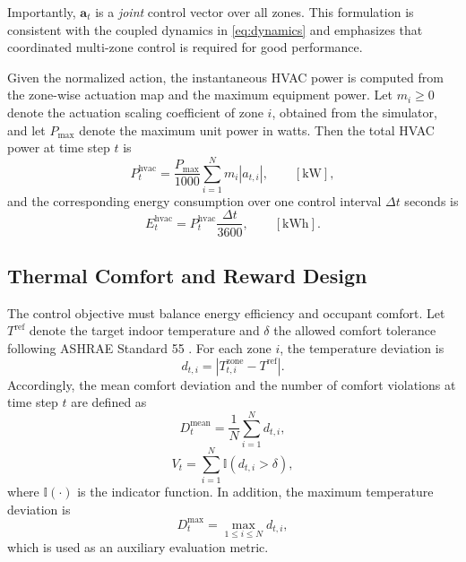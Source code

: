 \documentclass[lettersize,journal]{IEEEtran}
\theoremstyle{nonumberplain}     \theoremheaderfont{\bfseries\itshape}     \theorembodyfont{\normalfont}     \theoremseparator{:}     \theoremsymbol{\ensuremath{\blacksquare}}     \newtheorem{proof}{Proof}
\theoremstyle{plain}     \theoremheaderfont{\bfseries\itshape}     \theorembodyfont{\normalfont}     \theoremseparator{:}     \theoremsymbol{\ensuremath{\blacksquare}}     \newtheorem{remark}{Remark}
\begin{document}
Importantly, $\mathbf{a}_t$ is a \emph{joint} control vector over all zones. This formulation is consistent with the coupled dynamics in \eqref{eq:dynamics} and emphasizes that coordinated multi-zone control is required for good performance.

Given the normalized action, the instantaneous HVAC power is computed from the zone-wise actuation map and the maximum equipment power. Let $m_i \ge 0$ denote the actuation scaling coefficient of zone $i$, obtained from the simulator, and let $P_{\max}$ denote the maximum unit power in watts. Then the total HVAC power at time step $t$ is
\begin{equation}
    P_t^{\mathrm{hvac}}
    =
    \frac{P_{\max}}{1000}
    \sum_{i=1}^{N} m_i |a_{t,i}|,
    \qquad [\mathrm{kW}],
    \label{eq:power}
\end{equation}
and the corresponding energy consumption over one control interval $\Delta t$ seconds is
\begin{equation}
    E_t^{\mathrm{hvac}}
    =
    P_t^{\mathrm{hvac}} \frac{\Delta t}{3600},
    \qquad [\mathrm{kWh}].
    \label{eq:energy}
\end{equation}

\subsection{Thermal Comfort and Reward Design}
The control objective must balance energy efficiency and occupant comfort. Let $T^{\mathrm{ref}}$ denote the target indoor temperature and $\delta$ the allowed comfort tolerance following ASHRAE Standard 55 \cite{standard2023thermal}. For each zone $i$, the temperature deviation is
\begin{equation}
    d_{t,i} = \left| T_{t,i}^{\mathrm{zone}} - T^{\mathrm{ref}} \right|.
\end{equation}
Accordingly, the mean comfort deviation and the number of comfort violations at time step $t$ are defined as
\begin{equation}
    D_t^{\mathrm{mean}} = \frac{1}{N} \sum_{i=1}^{N} d_{t,i},
    \label{eq:comfort_mean}
\end{equation}
\begin{equation}
    V_t = \sum_{i=1}^{N} \mathbb{I}(d_{t,i} > \delta),
    \label{eq:violation}
\end{equation}
where $\mathbb{I}(\cdot)$ is the indicator function. In addition, the maximum temperature deviation is
\begin{equation}
    D_t^{\mathrm{max}} = \max_{1 \le i \le N} d_{t,i},
    \label{eq:comfort_max}
\end{equation}
which is used as an auxiliary evaluation metric.
\end{document}

